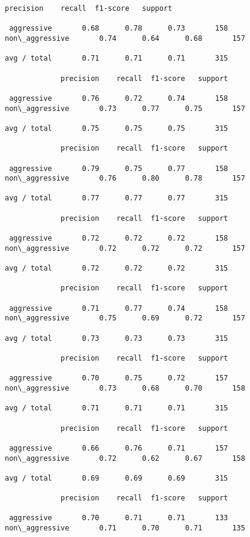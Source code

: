 \documentclass{article}
\begin{document}
    \begin{Verbatim}[commandchars=\\\{\}]
precision    recall  f1-score   support

 aggressive       0.68      0.78      0.73       158
non\_aggressive       0.74      0.64      0.68       157

avg / total       0.71      0.71      0.71       315

             precision    recall  f1-score   support

 aggressive       0.76      0.72      0.74       158
non\_aggressive       0.73      0.77      0.75       157

avg / total       0.75      0.75      0.75       315

             precision    recall  f1-score   support

 aggressive       0.79      0.75      0.77       158
non\_aggressive       0.76      0.80      0.78       157

avg / total       0.77      0.77      0.77       315

             precision    recall  f1-score   support

 aggressive       0.72      0.72      0.72       158
non\_aggressive       0.72      0.72      0.72       157

avg / total       0.72      0.72      0.72       315

             precision    recall  f1-score   support

 aggressive       0.71      0.77      0.74       158
non\_aggressive       0.75      0.69      0.72       157

avg / total       0.73      0.73      0.73       315

             precision    recall  f1-score   support

 aggressive       0.70      0.75      0.72       157
non\_aggressive       0.73      0.68      0.70       158

avg / total       0.71      0.71      0.71       315

             precision    recall  f1-score   support

 aggressive       0.66      0.76      0.71       157
non\_aggressive       0.72      0.62      0.67       158

avg / total       0.69      0.69      0.69       315

             precision    recall  f1-score   support

 aggressive       0.70      0.71      0.71       133
non\_aggressive       0.71      0.70      0.71       135


\end{Verbatim}
\end{document}
